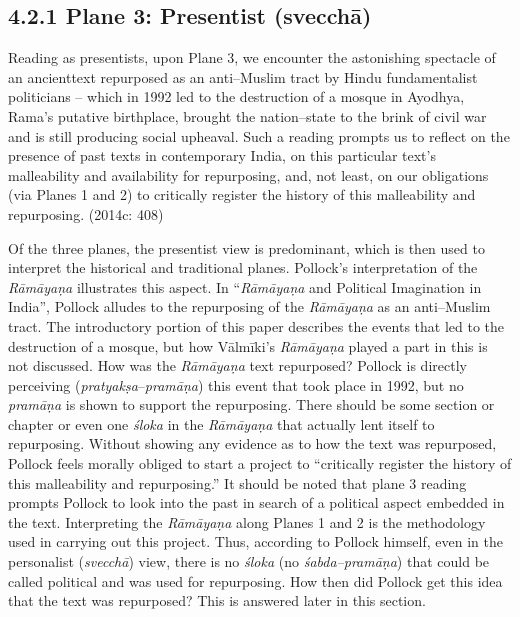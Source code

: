 \subsection*{4.2.1 Plane 3: Presentist (svecchā)}

\begin{myquote}
Reading as presentists, upon Plane 3, we encounter the astonishing spectacle of an ancienttext repurposed as an anti–Muslim tract by Hindu fundamentalist politicians – which in 1992 led to the destruction of a mosque in Ayodhya, Rama’s putative birthplace, brought the nation–state to the brink of civil war and is still producing social upheaval. Such a reading prompts us to reflect on the presence of past texts in contemporary India, on this particular text’s malleability and availability for repurposing, and, not least, on our obligations (via Planes 1 and 2) to critically register the history of this malleability and repurposing. (2014c: 408)
\end{myquote}

Of the three planes, the presentist view is predominant, which is then used to interpret the historical and traditional planes. Pollock’s interpretation of the \textit{Rāmāyaṇa }illustrates this aspect. In “\textit{Rāmāyaṇa }and Political Imagination in India”, Pollock alludes to the repurposing of the \textit{Rāmāyaṇa }as an anti–Muslim tract. The introductory portion of this paper describes the events that led to the destruction of a mosque, but how Vālmīki’s\textit{ Rāmāyaṇa }played a part in this is not discussed. How was the \textit{Rāmāyaṇa }text repurposed? Pollock is directly perceiving (\textit{pratyakṣa}–\textit{pramāṇa}) this event that took place in 1992, but no \textit{pramāṇa} is shown to support the repurposing. There should be some section or chapter or even one \textit{śloka} in the \textit{Rāmāyaṇa }that actually lent itself to repurposing. Without showing any evidence as to how the text was repurposed, Pollock feels morally obliged to start a project to “critically register the history of this malleability and repurposing.” It should be noted that plane 3 reading prompts Pollock to look into the past in search of a political aspect embedded in the text. Interpreting the \textit{Rāmāyaṇa} along Planes 1 and 2 is the methodology used in carrying out this project. Thus, according to Pollock himself, even in the personalist (\textit{svecchā}) view, there is no \textit{śloka} (no \textit{śabda–pramāṇa}) that could be called political and was used for repurposing. How then did Pollock get this idea that the text was repurposed? This is answered later in this section.

